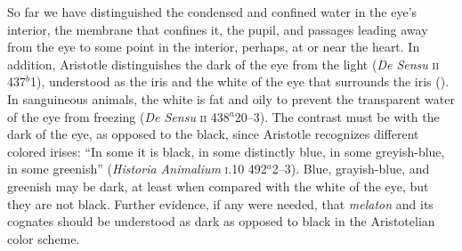 So far we have distinguished the condensed and confined water in the eye's interior, the membrane that confines it, the pupil, and passages leading away from the eye to some point in the interior, perhaps, at or near the heart. In addition, Aristotle distinguishes the dark of the eye from the light (\emph{De Sensu} \textsc{ii} 437\( ^{b} \)1), understood as the iris and the white of the eye that surrounds the iris (\citealt[see][218, 231 n13]{Lloyd:1978fk}). In sanguineous animals, the white is fat and oily to prevent the transparent water of the eye from freezing (\emph{De Sensu} \textsc{ii} 438\( ^{a} \)20--3). The contrast must be with the dark of the eye, as opposed to the black, since Aristotle recognizes different colored irises: ``In some it is black, in some distinctly blue, in some greyish-blue, in some greenish'' (\emph{Historia Animalium} \textsc{i}.10 492\( ^{a} \)2--3). Blue, grayish-blue, and greenish may be dark, at least when compared with the white of the eye, but they are not black. Further evidence, if any were needed, that \emph{melaton} and its cognates should be understood as dark as opposed to black in the Aristotelian color scheme.

